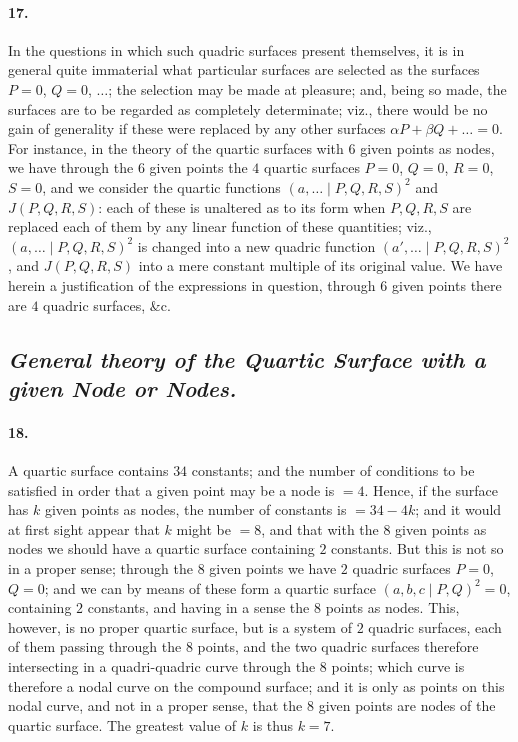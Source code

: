 \documentclass[11pt,a4paper]{article}
\begin{document}
\paragraph{17.}
In the questions in which such quadric surfaces present themselves, it is in general quite
immaterial what particular surfaces are selected as the surfaces $P = 0$, $Q = 0$, $\ldots$;
the selection may be made at pleasure; and, being so made, the surfaces are to be regarded
as completely determinate; viz., there would be no gain of generality if these were
replaced by any other surfaces $\alpha P + \beta Q + \ldots = 0$. For instance, in the
theory of the quartic surfaces with $6$ given points as nodes, we have through the $6$
given points the $4$ quartic surfaces $P = 0$, $Q = 0$, $R = 0$, $S = 0$, and we consider
the quartic functions $(a, \ldots  \mid P, Q, R, S)^2$ and $J(P, Q, R, S)$: each of
these is unaltered as to its form when $P, Q, R, S$ are replaced each of them by any linear
function of these quantities; viz., $(a, \ldots  \mid P, Q, R, S)^2$ is changed into a
new quadric function $(a', \ldots  \mid P, Q, R, S)^2$, and $J(P, Q, R, S)$ into a mere
constant multiple of its original value. We have herein a justification of the expressions
in question, through $6$ given points there are $4$ quadric surfaces, \&c.

\subsection*{\textit{General theory of the Quartic Surface with a given Node or Nodes.}}

\paragraph{18.}
A quartic surface contains $34$ constants; and the number of conditions to be satisfied in
order that a given point may be a node is $= 4$. Hence, if the surface has $k$ given points
as nodes, the number of constants is $= 34 - 4 k$; and it would at first sight appear that
$k$ might be $= 8$, and that with the $8$ given points as nodes we should have a quartic
surface containing $2$ constants. But this is not so in a proper sense; through the $8$
given points we have $2$ quadric surfaces $P = 0$, $Q = 0$; and we can by means of these
form a quartic surface $(a, b, c  \mid P, Q)^2 = 0$, containing $2$ constants, and
having in a sense the $8$ points as nodes. This, however, is no proper quartic surface, but
is a system of $2$ quadric surfaces, each of them passing through the $8$ points, and the
two quadric surfaces therefore intersecting in a quadri-quadric curve through the $8$
points; which curve is therefore a nodal curve on the compound surface; and it is only as
points on this nodal curve, and not in a proper sense, that the $8$ given points are nodes
of the quartic surface. The greatest value of $k$ is thus $k = 7$.
\end{document}
